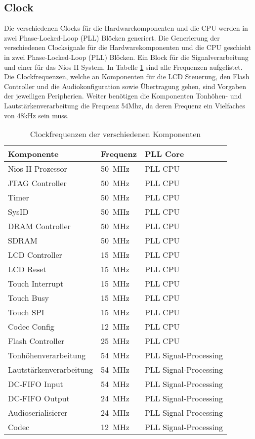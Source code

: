 \subsection{Clock}\label{subsec:Clock}
Die verschiedenen Clocks für die Hardwarekomponenten und die CPU werden in zwei Phase-Locked-Loop (PLL) Blöcken generiert. Die Generierung der verschiedenen Clocksignale für die Hardwarekomponenten und die CPU geschieht in zwei Phase-Locked-Loop (PLL) Blöcken. Ein Block für die Signalverarbeitung und einer für das Nios II System. In Tabelle \ref{tab:clocks} sind alle Frequenzen aufgelistet. \\
Die Clockfrequenzen, welche an Komponenten für die LCD Steuerung, den Flash Controller und die Audiokonfiguration sowie Übertragung gehen, sind Vorgaben der jeweiligen Peripherien. Weiter benötigen die Komponenten Tonhöhen- und Lautstärkenverarbeitung die Frequenz 54Mhz, da deren Frequenz ein Vielfaches von 48kHz sein muss.

\begin{table}[H]
	\centering
	\caption{Clockfrequenzen der verschiedenen Komponenten}
	\label{tab:clocks}
	\begin{tabular}{l|l|l}
		\textbf{Komponente} & \textbf{Frequenz} & \textbf{PLL Core} \\
		\hline\hline
		Nios II Prozessor & \SI{50}{MHz} & PLL CPU  \\ \hline
		JTAG Controller & \SI{50}{MHz} & PLL CPU \\ \hline
		Timer & \SI{50}{MHz} & PLL CPU \\ \hline
		SysID & \SI{50}{MHz} & PLL CPU \\ \hline
		DRAM Controller & \SI{50}{MHz} & PLL CPU \\ \hline
		SDRAM & \SI{50}{MHz} & PLL CPU \\ \hline
		LCD Controller & \SI{15}{MHz} & PLL CPU \\ \hline
		LCD Reset & \SI{15}{MHz} & PLL CPU \\ \hline
		Touch Interrupt & \SI{15}{MHz} & PLL CPU \\ \hline
		Touch Busy & \SI{15}{MHz} & PLL CPU \\ \hline
		Touch SPI & \SI{15}{MHz} & PLL CPU \\ \hline
		Codec Config & \SI{12}{MHz} & PLL CPU \\ \hline
		Flash Controller & \SI{25}{MHz} & PLL CPU \\ \hline
		Tonhöhenverarbeitung & \SI{54}{MHz} & PLL Signal-Processing \\ \hline
		Lautstärkenverarbeitung & \SI{54}{MHz} & PLL Signal-Processing \\ \hline
		DC-FIFO Input	& \SI{54}{MHz} & PLL Signal-Processing \\ \hline
		DC-FIFO Output	& \SI{24}{MHz} & PLL Signal-Processing \\ \hline
	 	Audioserialisierer	& \SI{24}{MHz} & PLL Signal-Processing \\ \hline
	 	Codec	& \SI{12}{MHz} & PLL Signal-Processing \\ \hline
		
	\end{tabular}
\end{table}
